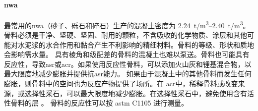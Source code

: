\paragraph{\acrfull*{nwa}}
最常用的\acrlong*{nwa}（砂子、砾石和碎石）生产的混凝土密度为 \qtyrange{2.24}{2.40}{t/m^3}。 骨料必须是干净、坚硬、坚固、耐用的颗粒，不含吸收的化学物质、涂层和其他可能对水泥浆的水合作用和黏合产生不利影响的精细材料\cite{kosmatka2011d}。骨料的等级、形状和质地会影响需水量。 具有棱角和级配差的骨料的混凝土也难以泵送。骨料也可能具有反应性，导致\acrfull*{asr}或\acrfull*{acr}。如果使用反应性骨料，可以添加火山灰和锂基混合物，以最大限度地减少膨胀并提供抗\acrlong*{asr}能力。 如果由于混凝土中的其他骨料而发生任何膨胀，则骨料中的空间也为反应产物提供了场所。在 \acrlong*{acr}中，稀释骨料或改变来源，或选择性采石，可以最大限度地减少膨胀。在选择性采石中，避免使用含有活性骨料的层 \cite{ozol1994a}。 骨料的反应性可以按 \acrshort*{astm} C1105 进行测量。

